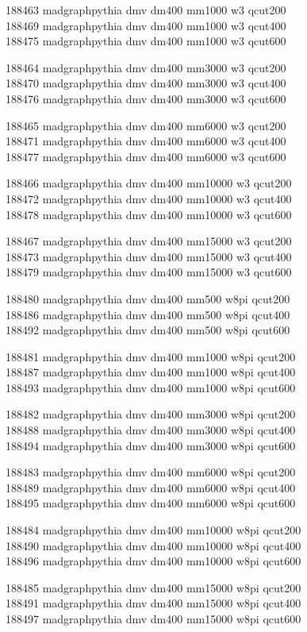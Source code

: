 188463 madgraphpythia  dmv dm400 mm1000 w3 qcut200\\
188469 madgraphpythia  dmv dm400 mm1000 w3 qcut400\\
188475 madgraphpythia  dmv dm400 mm1000 w3 qcut600

188464 madgraphpythia  dmv dm400 mm3000 w3 qcut200\\
188470 madgraphpythia  dmv dm400 mm3000 w3 qcut400\\
188476 madgraphpythia  dmv dm400 mm3000 w3 qcut600

188465 madgraphpythia  dmv dm400 mm6000 w3 qcut200\\
188471 madgraphpythia  dmv dm400 mm6000 w3 qcut400\\
188477 madgraphpythia  dmv dm400 mm6000 w3 qcut600

188466 madgraphpythia  dmv dm400 mm10000 w3 qcut200\\
188472 madgraphpythia  dmv dm400 mm10000 w3 qcut400\\
188478 madgraphpythia  dmv dm400 mm10000 w3 qcut600

188467 madgraphpythia  dmv dm400 mm15000 w3 qcut200\\
188473 madgraphpythia  dmv dm400 mm15000 w3 qcut400\\
188479 madgraphpythia  dmv dm400 mm15000 w3 qcut600

188480 madgraphpythia  dmv dm400 mm500 w8pi qcut200\\
188486 madgraphpythia  dmv dm400 mm500 w8pi qcut400\\
188492 madgraphpythia  dmv dm400 mm500 w8pi qcut600

188481 madgraphpythia  dmv dm400 mm1000 w8pi qcut200\\
188487 madgraphpythia  dmv dm400 mm1000 w8pi qcut400\\
188493 madgraphpythia  dmv dm400 mm1000 w8pi qcut600

188482 madgraphpythia  dmv dm400 mm3000 w8pi qcut200\\
188488 madgraphpythia  dmv dm400 mm3000 w8pi qcut400\\
188494 madgraphpythia  dmv dm400 mm3000 w8pi qcut600

188483 madgraphpythia  dmv dm400 mm6000 w8pi qcut200\\
188489 madgraphpythia  dmv dm400 mm6000 w8pi qcut400\\
188495 madgraphpythia  dmv dm400 mm6000 w8pi qcut600

188484 madgraphpythia  dmv dm400 mm10000 w8pi qcut200\\
188490 madgraphpythia  dmv dm400 mm10000 w8pi qcut400\\
188496 madgraphpythia  dmv dm400 mm10000 w8pi qcut600

188485 madgraphpythia  dmv dm400 mm15000 w8pi qcut200\\
188491 madgraphpythia  dmv dm400 mm15000 w8pi qcut400\\
188497 madgraphpythia  dmv dm400 mm15000 w8pi qcut600